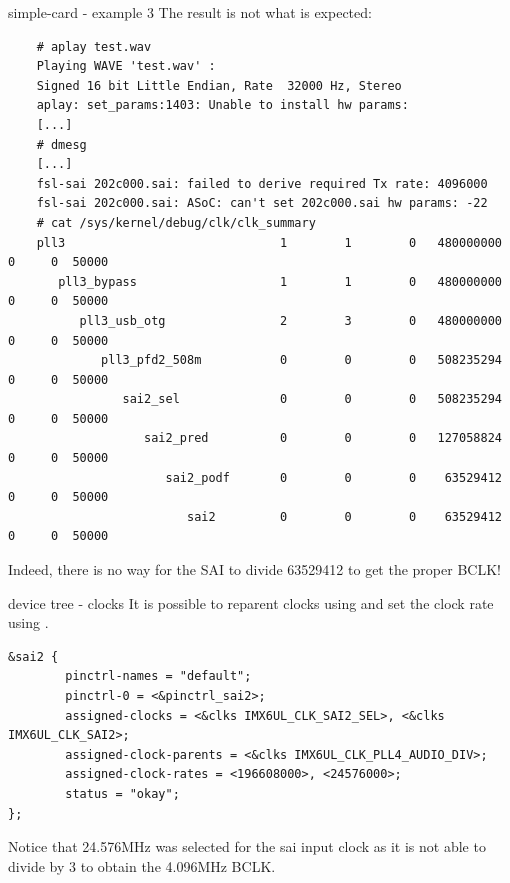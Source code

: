 \begin{frame}[fragile]{simple-card - example 3}
  The result is not what is expected:
  \begin{block}{}
    \fontsize{7}{6}\selectfont
    \begin{verbatim}
    # aplay test.wav
    Playing WAVE 'test.wav' :
    Signed 16 bit Little Endian, Rate  32000 Hz, Stereo
    aplay: set_params:1403: Unable to install hw params:
    [...]
    # dmesg
    [...]
    fsl-sai 202c000.sai: failed to derive required Tx rate: 4096000
    fsl-sai 202c000.sai: ASoC: can't set 202c000.sai hw params: -22
    # cat /sys/kernel/debug/clk/clk_summary
    pll3                              1        1        0   480000000          0     0  50000
       pll3_bypass                    1        1        0   480000000          0     0  50000
          pll3_usb_otg                2        3        0   480000000          0     0  50000
             pll3_pfd2_508m           0        0        0   508235294          0     0  50000
                sai2_sel              0        0        0   508235294          0     0  50000
                   sai2_pred          0        0        0   127058824          0     0  50000
                      sai2_podf       0        0        0    63529412          0     0  50000
                         sai2         0        0        0    63529412          0     0  50000
    \end{verbatim}
  \end{block}
  Indeed, there is no way for the SAI to divide 63529412 to get the
  proper BCLK!
\end{frame}

\begin{frame}[fragile]{device tree - clocks}
  It is possible to reparent clocks using
   and set the clock rate using
  .
  \begin{block}{}
    \fontsize{7}{6}\selectfont
    \begin{verbatim}
&sai2 {
        pinctrl-names = "default";
        pinctrl-0 = <&pinctrl_sai2>;
        assigned-clocks = <&clks IMX6UL_CLK_SAI2_SEL>, <&clks IMX6UL_CLK_SAI2>;
        assigned-clock-parents = <&clks IMX6UL_CLK_PLL4_AUDIO_DIV>;
        assigned-clock-rates = <196608000>, <24576000>;
        status = "okay";
};
    \end{verbatim}
  \end{block}
  Notice that 24.576MHz was selected for the sai input clock as it is
  not able to divide by 3 to obtain the 4.096MHz BCLK.
\end{frame}

